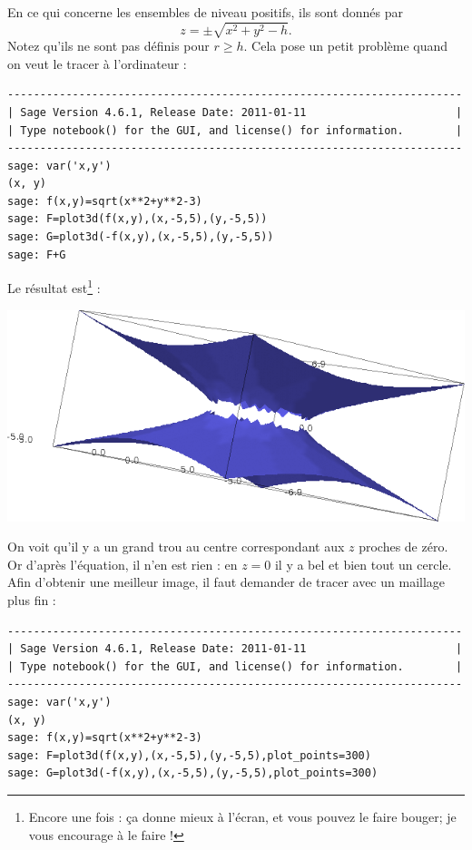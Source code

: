 \begin{example}
    En ce qui concerne les ensembles de niveau positifs, ils sont donnés par
    \begin{equation}
        z=\pm\sqrt{x^2+y^2-h}.
    \end{equation}
    Notez qu'ils ne sont pas définis pour $r\geq h$. Cela pose un petit problème quand on veut le tracer à l'ordinateur :
    \begin{verbatim}
----------------------------------------------------------------------
| Sage Version 4.6.1, Release Date: 2011-01-11                       |
| Type notebook() for the GUI, and license() for information.        |
----------------------------------------------------------------------
sage: var('x,y')
(x, y)
sage: f(x,y)=sqrt(x**2+y**2-3)
sage: F=plot3d(f(x,y),(x,-5,5),(y,-5,5)) 
sage: G=plot3d(-f(x,y),(x,-5,5),(y,-5,5))    
sage: F+G
    \end{verbatim}
Le résultat est\footnote{Encore une fois : ça donne mieux à l'écran, et vous pouvez le faire bouger; je vous encourage à le faire !} :
    \begin{center}
            \includegraphics[width=15cm]{pictures_bitmap/AdSmauvais.png}
    \end{center}
    On voit qu'il y a un grand trou au centre correspondant aux $z$ proches de zéro. Or d'après l'équation, il n'en est rien : en $z=0$ il y a bel et bien tout un cercle. Afin d'obtenir une meilleur image, il faut demander de tracer avec un maillage plus fin :
    \begin{verbatim}
----------------------------------------------------------------------
| Sage Version 4.6.1, Release Date: 2011-01-11                       |
| Type notebook() for the GUI, and license() for information.        |
----------------------------------------------------------------------
sage: var('x,y')
(x, y)
sage: f(x,y)=sqrt(x**2+y**2-3)
sage: F=plot3d(f(x,y),(x,-5,5),(y,-5,5),plot_points=300) 
sage: G=plot3d(-f(x,y),(x,-5,5),(y,-5,5),plot_points=300)

\end{verbatim}
\end{example}
